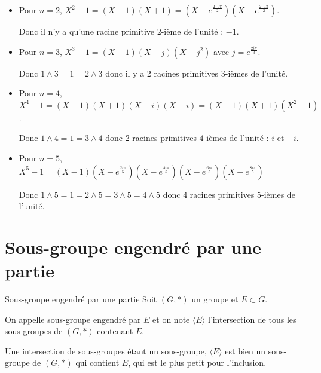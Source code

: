 \begin{exemple}
    \begin{itemize}
        \item Pour $n = 2$, $X^2 - 1 = (X - 1)(X + 1) = \left(X - e^{\frac{2 \cdot 0 \pi} 2}\right)\left(X - e^{\frac{2 \cdot 1 \pi}2}\right)$.

        Donc il n'y a qu'une racine primitive $2$-ième de l'unité : $-1$.
    
        \item Pour $n = 3$, $X^3 - 1 = (X - 1)(X - j)(X - j^2)$ avec $j = e^{\frac{2i\pi}3}$.
        
        Donc $1 \wedge 3 = 1 = 2 \wedge 3$ donc il y a 2 racines primitives $3$-ièmes de l'unité.

        \item Pour $n = 4$, $X^4 - 1 = (X - 1)(X + 1)(X - i)(X + i) = (X - 1)(X + 1)(X^2 + 1)$.
        
        Donc $1 \wedge 4 = 1 = 3 \wedge 4$ donc 2 racines primitives $4$-ièmes de l'unité : $i$ et $-i$.
    
        \item Pour $n = 5$, $X^5 - 1 = (X - 1)\left(X - e^{\frac{2i\pi}5}\right)\left(X - e^{\frac{4i\pi}5}\right)\left(X - e^{\frac{6i\pi}5}\right)\left(X - e^{\frac{8i\pi}5}\right)$

        Donc $1 \wedge 5 = 1 = 2 \wedge 5 = 3 \wedge 5 = 4 \wedge 5$ donc 4 racines primitives $5$-ièmes de l'unité.
    \end{itemize}
\end{exemple}

\section{Sous-groupe engendré par une partie}

\begin{definition}{Sous-groupe engendré par une partie}{}
    Soit $(G, \ast)$ un groupe et $E \subset G$.

    On appelle sous-groupe engendré par $E$ et on note $\langle E \rangle$
    l'intersection de tous les sous-groupes de $(G, \ast)$ contenant $E$.
\end{definition}

\begin{remarque}
    Une intersection de sous-groupes étant un sous-groupe, $\langle E \rangle$ est bien un sous-groupe de $(G, \ast)$
    qui contient $E$, qui est le plus petit pour l'inclusion.
\end{remarque}

